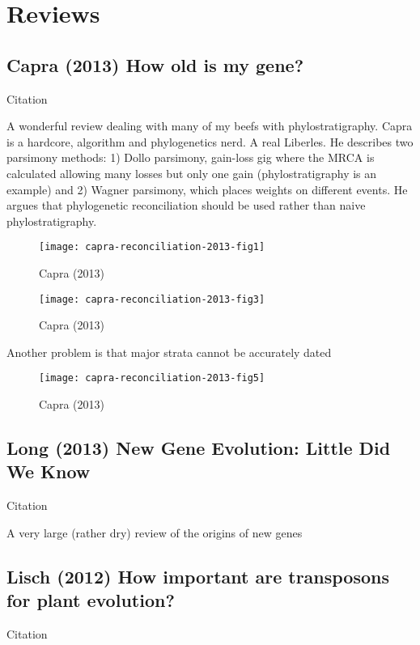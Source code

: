 \section{Reviews}
\subsection{Capra (2013) How old is my gene?}
    Citation \cite{capra_how_2013}

    A wonderful review dealing with many of my beefs with phylostratigraphy.
    Capra is a hardcore, algorithm and phylogenetics nerd. A real Liberles. He
    describes two parsimony methods: 1) Dollo parsimony, gain-loss gig where
    the MRCA is calculated allowing many losses but only one gain
    (phylostratigraphy is an example) and 2) Wagner parsimony, which places
    weights on different events. He argues that phylogenetic reconciliation
    should be used rather than naive phylostratigraphy.

    \begin{figure}[!hbpt]
        \centering
        \texttt{[image: capra-reconciliation-2013-fig1]}
        \caption{Capra (2013) \cite{capra_how_2013}}
    \end{figure}
    \FloatBarrier

    \begin{figure}[!hbpt]
        \centering
        \texttt{[image: capra-reconciliation-2013-fig3]}
        \caption{Capra (2013) \cite{capra_how_2013}}
    \end{figure}
    \FloatBarrier

    Another problem is that major strata cannot be accurately dated

    \begin{figure}[!hbpt]
        \centering
        \texttt{[image: capra-reconciliation-2013-fig5]}
        \caption{Capra (2013) \cite{capra_how_2013}}
    \end{figure}
    \FloatBarrier

\subsection{Long (2013) New Gene Evolution: Little Did We Know}
    Citation \cite{long_new_2013}

    A very large (rather dry) review of the origins of new genes

\subsection{Lisch (2012) How important are transposons for plant evolution?}
    Citation \cite{lisch_how_2012}
    
